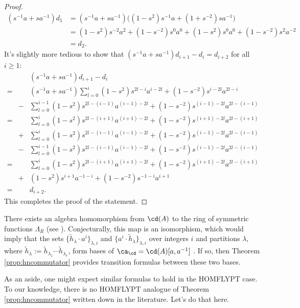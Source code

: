 \begin{proof}
\begin{align*}
( s^{-1} a + s a^{-1} ) d_1 &= ( s^{-1} a + s a^{-1} ) \big( ( 1 - s^2 ) s^{-1} a + ( 1 + s^{-2} ) s a^{-1} \big) \\
&= ( 1 - s^2 ) s^{-2} a^2 + (1 - s^{-2} ) s^0 a^0 + ( 1 - s^2 ) s^0 a^0 + ( 1 - s^{-2} ) s^2 a^{-2} \\
&= d_2.
\end{align*}
It's slightly more tedious to show that $( s^{-1} a + s a^{-1} ) d_{i+1} - d_i = d_{i+2}$ for all $i \geq 1$:
\begin{eqnarray*}
&&( s^{-1} a + s a^{-1} ) d_{i+1} - d_i \\
=&& ( s^{-1} a + s a^{-1} ) \sum_{l=0}^{i} (1 - s^2) s^{2l-i} a^{i-2l} + (1 - s^{-2}) s^{i-2l} a^{2l-i} \\
&-& \sum_{l=0}^{i-1} (1 - s^2) s^{2l-(i-1)} a^{(i-1)-2l} + (1 - s^{-2}) s^{(i-1)-2l} a^{2l-(i-1)} \\
=&& \sum_{l=0}^{i} (1 - s^2) s^{2l-(i+1)} a^{(i+1)-2l} + (1 - s^{-2}) s^{(i+1)-2l} a^{2l-(i+1)} \\
&+& \sum_{l=0}^{i} (1 - s^2) s^{2l-(i-1)} a^{(i-1)-2l} + (1 - s^{-2}) s^{(i-1)-2l} a^{2l-(i-1)} \\
&-& \sum_{l=0}^{i-1} (1 - s^2) s^{2l-(i-1)} a^{(i-1)-2l} + (1 - s^{-2}) s^{(i-1)-2l} a^{2l-(i-1)} \\
=&& \sum_{l=0}^{i} (1 - s^2) s^{2l-(i+1)} a^{(i+1)-2l} + (1 - s^{-2}) s^{(i+1)-2l} a^{2l-(i+1)} \\
&+& (1 - s^2) s^{i+1} a^{-1-i} + (1 - s^{-2}) s^{-1-i} a^{i+1} \\
=&& d_{i+2}.
\end{eqnarray*}
This completes the proof of the statement. 
\end{proof}

\begin{remark}
There exists an algebra homomorphism from $\cd(A)$ to the ring of symmetric functions $\Lambda_R$ (see ). Conjecturally, this map is an isomorphism, which would imply that the sets $\{ \tilde{h}_\lambda \cdot a^i \}_{\lambda, i}$ and $\{ a^i \cdot \tilde{h}_\lambda \}_{\lambda, i}$ over integers $i$ and partitions $\lambda$, where $\tilde{h}_\lambda := \tilde{h}_{\lambda_1} \cdots \tilde{h}_{\lambda_r}$, form bases of $\ca_\cd = \cd(A)[a, a^{-1}]$ . If so, then Theorem \ref{prop:hncommutator} provides transition formulas between these two bases. 
\end{remark}

As an aside, one might expect similar formulas to hold in the HOMFLYPT case. To our knowledge, there is no HOMFLYPT analogue of Theorem \ref{prop:hncommutator} written down in the literature. Let's do that here. 

